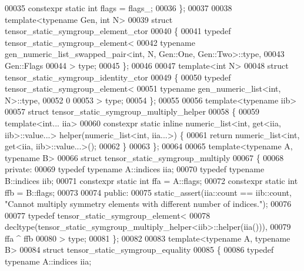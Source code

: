 \begin{DoxyCode}
00035   constexpr \textcolor{keyword}{static} \textcolor{keywordtype}{int} flags = flags\_;
00036 \};
00037 
00038 \textcolor{keyword}{template}<\textcolor{keyword}{typename} Gen, \textcolor{keywordtype}{int} N>
00039 \textcolor{keyword}{struct }tensor\_static\_symgroup\_element\_ctor
00040 \{
00041   \textcolor{keyword}{typedef} tensor\_static\_symgroup\_element<
00042     \textcolor{keyword}{typename} gen\_numeric\_list\_swapped\_pair<int, N, Gen::One, Gen::Two>::type,
00043     Gen::Flags
00044   > type;
00045 \};
00046 
00047 \textcolor{keyword}{template}<\textcolor{keywordtype}{int} N>
00048 \textcolor{keyword}{struct }tensor\_static\_symgroup\_identity\_ctor
00049 \{
00050   \textcolor{keyword}{typedef} tensor\_static\_symgroup\_element<
00051     \textcolor{keyword}{typename} gen\_numeric\_list<int, N>::type,
00052     0
00053   > type;
00054 \};
00055 
00056 \textcolor{keyword}{template}<\textcolor{keyword}{typename} iib>
00057 \textcolor{keyword}{struct }tensor\_static\_symgroup\_multiply\_helper
00058 \{
00059   \textcolor{keyword}{template}<\textcolor{keywordtype}{int}... iia>
00060   constexpr \textcolor{keyword}{static} \textcolor{keyword}{inline} numeric\_list<int, get<iia, iib>::value...> helper(numeric\_list<int, iia...>) \{
00061     \textcolor{keywordflow}{return} numeric\_list<int, get<iia, iib>::value...>();
00062   \}
00063 \};
00064 
00065 \textcolor{keyword}{template}<\textcolor{keyword}{typename} A, \textcolor{keyword}{typename} B>
00066 \textcolor{keyword}{struct }tensor\_static\_symgroup\_multiply
00067 \{
00068   \textcolor{keyword}{private}:
00069     \textcolor{keyword}{typedef} \textcolor{keyword}{typename} A::indices iia;
00070     \textcolor{keyword}{typedef} \textcolor{keyword}{typename} B::indices iib;
00071     constexpr \textcolor{keyword}{static} \textcolor{keywordtype}{int} ffa = A::flags;
00072     constexpr \textcolor{keyword}{static} \textcolor{keywordtype}{int} ffb = B::flags;
00073   
00074   \textcolor{keyword}{public}:
00075     static\_assert(iia::count == iib::count, \textcolor{stringliteral}{"Cannot multiply symmetry elements with different number of
       indices."});
00076 
00077     \textcolor{keyword}{typedef} tensor\_static\_symgroup\_element<
00078       decltype(tensor\_static\_symgroup\_multiply\_helper<iib>::helper(iia())),
00079       ffa ^ ffb
00080     > type;
00081 \};
00082 
00083 \textcolor{keyword}{template}<\textcolor{keyword}{typename} A, \textcolor{keyword}{typename} B>
00084 \textcolor{keyword}{struct }tensor\_static\_symgroup\_equality
00085 \{
00086     \textcolor{keyword}{typedef} \textcolor{keyword}{typename} A::indices iia;

\end{DoxyCode}
